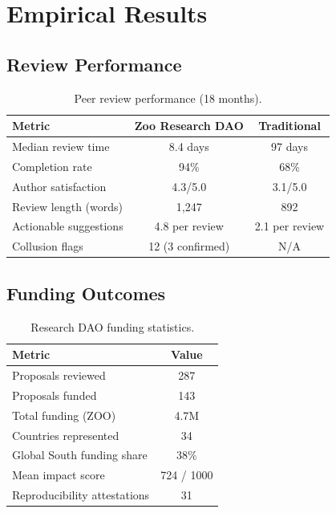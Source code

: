 \documentclass[11pt,letterpaper]{article}
\begin{document}
\section{Empirical Results}
\label{sec:results}

\subsection{Review Performance}

\begin{table}[h]
\centering
\caption{Peer review performance (18 months).}
\label{tab:perf}
\begin{tabular}{lcc}
\toprule
\textbf{Metric} & \textbf{Zoo Research DAO} & \textbf{Traditional} \\
\midrule
Median review time & 8.4 days & 97 days \\
Completion rate & 94\% & 68\% \\
Author satisfaction & 4.3/5.0 & 3.1/5.0 \\
Review length (words) & 1{,}247 & 892 \\
Actionable suggestions & 4.8 per review & 2.1 per review \\
Collusion flags & 12 (3 confirmed) & N/A \\
\bottomrule
\end{tabular}
\end{table}

\subsection{Funding Outcomes}

\begin{table}[h]
\centering
\caption{Research DAO funding statistics.}
\label{tab:funding}
\begin{tabular}{lc}
\toprule
\textbf{Metric} & \textbf{Value} \\
\midrule
Proposals reviewed & 287 \\
Proposals funded & 143 \\
Total funding (ZOO) & 4.7M \\
Countries represented & 34 \\
Global South funding share & 38\% \\
Mean impact score & 724 / 1000 \\
Reproducibility attestations & 31 \\
\bottomrule
\end{tabular}
\end{table}
\end{document}
